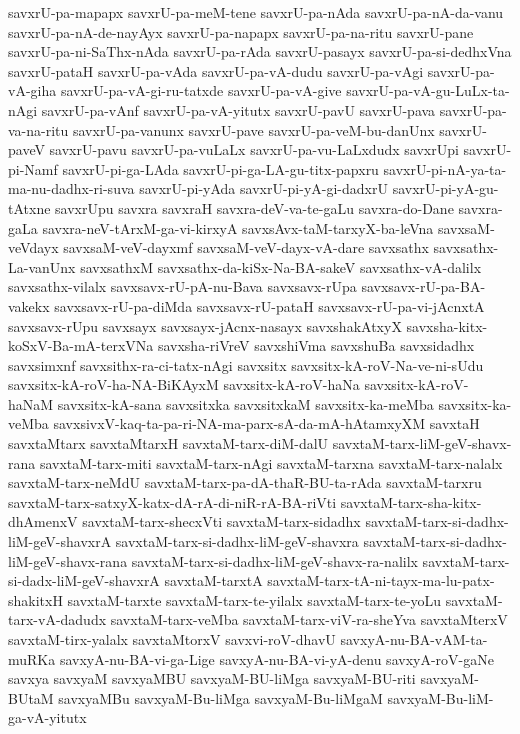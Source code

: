 {savxrU-pa-mapapx
savxrU-pa-meM-tene
savxrU-pa-nAda
savxrU-pa-nA-da-vanu
savxrU-pa-nA-de-nayAyx
savxrU-pa-napapx
savxrU-pa-na-ritu
savxrU-pane
savxrU-pa-ni-SaThx-nAda
savxrU-pa-rAda
savxrU-pasayx
savxrU-pa-si-dedhxVna
savxrU-pataH
savxrU-pa-vAda
savxrU-pa-vA-dudu
savxrU-pa-vAgi
savxrU-pa-vA-giha
savxrU-pa-vA-gi-ru-tatxde
savxrU-pa-vA-give
savxrU-pa-vA-gu-LuLx-ta-nAgi
savxrU-pa-vAnf
savxrU-pa-vA-yitutx
savxrU-pavU
savxrU-pava
savxrU-pa-va-na-ritu
savxrU-pa-vanunx
savxrU-pave
savxrU-pa-veM-bu-danUnx
savxrU-paveV
savxrU-pavu
savxrU-pa-vuLaLx
savxrU-pa-vu-LaLxdudx
savxrUpi
savxrU-pi-Namf
savxrU-pi-ga-LAda
savxrU-pi-ga-LA-gu-titx-papxru
savxrU-pi-nA-ya-ta-ma-nu-dadhx-ri-suva
savxrU-pi-yAda
savxrU-pi-yA-gi-dadxrU
savxrU-pi-yA-gu-tAtxne
savxrUpu
savxra
savxraH
savxra-deV-va-te-gaLu
savxra-do-Dane
savxra-gaLa
savxra-neV-tArxM-ga-vi-kirxyA
savxsAvx-taM-tarxyX-ba-leVna
savxsaM-veVdayx
savxsaM-veV-dayxmf
savxsaM-veV-dayx-vA-dare
savxsathx
savxsathx-La-vanUnx
savxsathxM
savxsathx-da-kiSx-Na-BA-sakeV
savxsathx-vA-dalilx
savxsathx-vilalx
savxsavx-rU-pA-nu-Bava
savxsavx-rUpa
savxsavx-rU-pa-BA-vakekx
savxsavx-rU-pa-diMda
savxsavx-rU-pataH
savxsavx-rU-pa-vi-jAcnxtA
savxsavx-rUpu
savxsayx
savxsayx-jAcnx-nasayx
savxshakAtxyX
savxsha-kitx-koSxV-Ba-mA-terxVNa
savxsha-riVreV
savxshiVma
savxshuBa
savxsidadhx
savxsimxnf
savxsithx-ra-ci-tatx-nAgi
savxsitx
savxsitx-kA-roV-Na-ve-ni-sUdu
savxsitx-kA-roV-ha-NA-BiKAyxM
savxsitx-kA-roV-haNa
savxsitx-kA-roV-haNaM
savxsitx-kA-sana
savxsitxka
savxsitxkaM
savxsitx-ka-meMba
savxsitx-ka-veMba
savxsivxV-kaq-ta-pa-ri-NA-ma-parx-sA-da-mA-hAtamxyXM
savxtaH
savxtaMtarx
savxtaMtarxH
savxtaM-tarx-diM-dalU
savxtaM-tarx-liM-geV-shavx-rana
savxtaM-tarx-miti
savxtaM-tarx-nAgi
savxtaM-tarxna
savxtaM-tarx-nalalx
savxtaM-tarx-neMdU
savxtaM-tarx-pa-dA-thaR-BU-ta-rAda
savxtaM-tarxru
savxtaM-tarx-satxyX-katx-dA-rA-di-niR-rA-BA-riVti
savxtaM-tarx-sha-kitx-dhAmenxV
savxtaM-tarx-shecxVti
savxtaM-tarx-sidadhx
savxtaM-tarx-si-dadhx-liM-geV-shavxrA
savxtaM-tarx-si-dadhx-liM-geV-shavxra
savxtaM-tarx-si-dadhx-liM-geV-shavx-rana
savxtaM-tarx-si-dadhx-liM-geV-shavx-ra-nalilx
savxtaM-tarx-si-dadx-liM-geV-shavxrA
savxtaM-tarxtA
savxtaM-tarx-tA-ni-tayx-ma-lu-patx-shakitxH
savxtaM-tarxte
savxtaM-tarx-te-yilalx
savxtaM-tarx-te-yoLu
savxtaM-tarx-vA-dadudx
savxtaM-tarx-veMba
savxtaM-tarx-viV-ra-sheYva
savxtaMterxV
savxtaM-tirx-yalalx
savxtaMtorxV
savxvi-roV-dhavU
savxyA-nu-BA-vAM-ta-muRKa
savxyA-nu-BA-vi-ga-Lige
savxyA-nu-BA-vi-yA-denu
savxyA-roV-gaNe
savxya
savxyaM
savxyaMBU
savxyaM-BU-liMga
savxyaM-BU-riti
savxyaM-BUtaM
savxyaMBu
savxyaM-Bu-liMga
savxyaM-Bu-liMgaM
savxyaM-Bu-liM-ga-vA-yitutx
}
